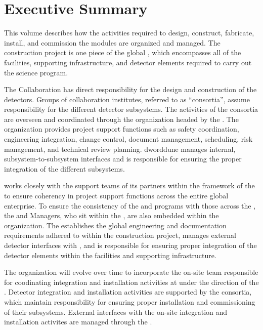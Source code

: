 \chapter{Executive Summary}

\label{vl:tc-execsum}

This volume describes how the activities required to design, construct,
fabricate, install, and commission the   modules 
are organized and managed.  The   construction 
project is one piece of the global , which encompasses
all of the facilities, supporting infrastructure, and detector elements
required to carry out the  science program.

The  Collaboration has direct responsibility for the design
and construction of the  detectors.  Groups of collaboration
institutes, referred to as ``consortia'', assume responsibility for
the different detector subsystems.  The activities of the consortia are
overseen and coordinated through the   organization
headed by the  .  The  organization
provides project support functions such as safety coordination,
engineering integration, change control, document management, scheduling,
risk management, and technical review planning.  dword{dune} 
manages internal, subsystem-to-subsystem interfaces and is responsible
for ensuring the proper integration of the different subsystems.

  works closely with the support teams of its
 partners within the framework of the  to
ensure coherency in project support functions across the entire global
enterprise.  To ensure the consistency of the  
and  programs with those across the , the
  and  Managers, who sit within
the , are also embedded within the  
organization.  The  establishes the global engineering
and documentation requirements adhered to within the 
 construction project, manages external  detector
interfaces with , and is responsible for ensuring proper
integration of the  detector elements within the facilities
and supporting infrastructure.

The  organization will evolve over time to incorporate the
on-site team responsible for coodinating integration and installation
activities at  under the direction of the .
Detector integration and installation activities are supported by the
 consortia, which maintain responsibility for ensuring
proper installation and commissioning of their subsystems.  External
 interfaces with the on-site integration and installation
activites are managed through the .

